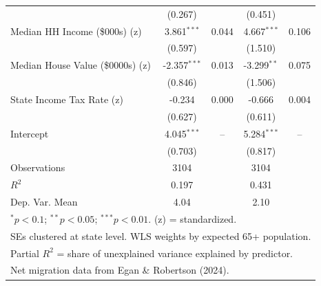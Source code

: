\begin{table}[htbp!]
\begin{tabular}{lcccc}
 & (0.267) & & (0.451) & \\
\quad Median HH Income (\$000s) (z) & 3.861$^{***}$ & 0.044 & 4.667$^{***}$ & 0.106 \\
 & (0.597) & & (1.510) & \\
\quad Median House Value (\$0000s) (z) & -2.357$^{***}$ & 0.013 & -3.299$^{**}$ & 0.075 \\
 & (0.846) & & (1.506) & \\
\quad State Income Tax Rate (z) & -0.234 & 0.000 & -0.666 & 0.004 \\
 & (0.627) & & (0.611) & \\
[3pt]
Intercept & 4.045$^{***}$ & -- & 5.284$^{***}$ & -- \\
 & (0.703) & & (0.817) & \\
\hline
Observations & 3104 & & 3104 & \\
$R^2$ & 0.197 & & 0.431 & \\
Dep. Var. Mean & 4.04 & & 2.10 & \\
\hline\hline
\multicolumn{5}{l}{\footnotesize $^{*}p<0.1$; $^{**}p<0.05$; $^{***}p<0.01$. (z) = standardized.} \\
\multicolumn{5}{l}{\footnotesize SEs clustered at state level. WLS weights by expected 65+ population.} \\
\multicolumn{5}{l}{\footnotesize Partial $R^2$ = share of unexplained variance explained by predictor.} \\
\multicolumn{5}{l}{\footnotesize Net migration data from Egan \& Robertson (2024).} \\
\end{tabular}
\end{table}